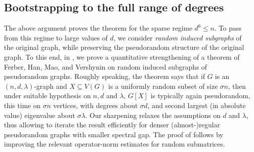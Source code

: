\documentclass[reqno,a4paper]{amsart}
\theoremstyle{definition}
\newcommand{\lyuc}[1]{{\color{blue}{ [~Lyuben:\ }\emph{#1}\textbf{~]}}}
\begin{document}
\subsection*{Bootstrapping to the full range of degrees}
The above argument proves the theorem for the sparse regime $d^6\le n$. To pass from this regime to large values of $d$, we consider \textit{random induced subgraphs} of the original graph, while preserving the pseudorandom structure of the original graph. 
To this end, in , we prove a quantitative strengthening of a theorem of Ferber, Han, Mao, and Vershynin \cite[Theorem 6.2]{FHMV25} on random induced subgraphs of pseudorandom graphs. 
Roughly speaking, the theorem says that if $G$ is an $(n,d,\lambda)$-graph and $X\subseteq V(G)$ is a uniformly random subset of size $\sigma n$, then under suitable hypothesis on $n,d$ and $\lambda$, $G[X]$ is typically again pseudorandom, this time on $\sigma n$ vertices, with degrees about $\sigma d$, and second largest (in absolute value) eigenvalue about $\sigma \lambda$. 
Our sharpening relaxes the assumptions on $d$ and $\lambda$, thus allowing to iterate the result efficiently for denser (almost-)regular pseudorandom graphs with smaller spectral gap.
The proof of  follows by improving the relevant operator-norm estimates for random submatrices.
\end{document}
